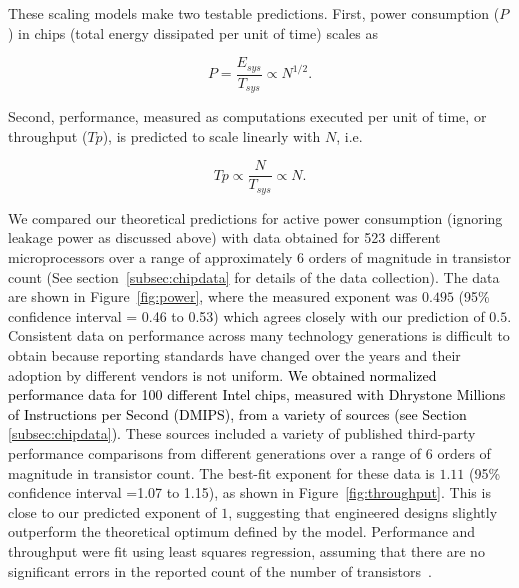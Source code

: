 \documentclass[12pt]{article}
\newcommand{\red}[1]{\textcolor{black}{#1}}
\begin{document}
These scaling models make two testable predictions.  First, power
consumption ($P$) in chips (total energy dissipated per unit of time) scales as

\begin{equation}
\label{eq:Power}
P = \frac{E_{sys}}{T_{sys}} \propto N^{1/2} .
\end{equation}
 
\noindent Second, performance,
measured as computations executed per unit of time, or throughput ($Tp$), is predicted
to scale linearly with $N$,  i.e.  

\begin{equation}
\label{eq:Performance}
Tp\propto \frac{N}{T_{sys}} \propto N .
\end{equation}

We compared our theoretical predictions for active power consumption (ignoring leakage power as discussed above) with data
obtained for 523 different microprocessors over a range of approximately 6
orders of magnitude in transistor count (See section~\ref{subsec:chipdata} for
details of the data collection).  The data are shown in
Figure~\ref{fig:power}, where the measured exponent was $0.495$ (95\%
confidence interval = 0.46 to 0.53) which agrees closely with our prediction of
$0.5$. Consistent data on performance across many technology generations is
difficult to obtain because reporting standards have changed over the years and
their adoption by different vendors is not uniform.  \red{We obtained
normalized performance data for 100 different Intel chips, measured
with \red{Dhrystone} Millions of Instructions per Second (DMIPS), from
a variety of sources (see Section \ref{subsec:chipdata}).} These sources included
a variety of published third-party performance comparisons from different
generations over a range of 6 orders of magnitude in transistor count.  The
best-fit exponent for these data is $1.11$ (95\% confidence interval =1.07 to
1.15), as shown in Figure~\ref{fig:throughput}. This is close to our
predicted exponent of $1$, suggesting that engineered designs slightly
outperform the theoretical optimum defined by the model. Performance and throughput were fit
using least squares regression, assuming that there
are no significant errors in the reported count of the number of transistors~\cite{mcardle1988structural}.  
\end{document}
